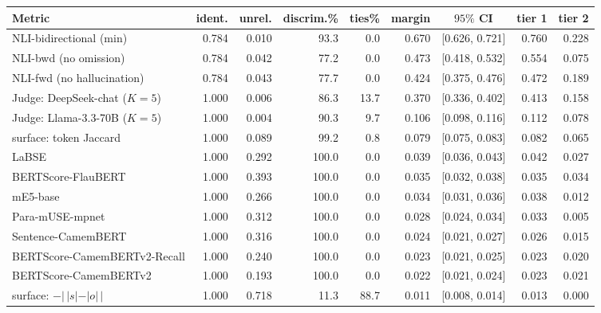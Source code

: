 \setlength{\tabcolsep}{3.5pt}
\begin{tabular}{lrrrrrcrr}
\toprule
Metric & ident. & unrel. & discrim.\% & ties\% & margin & $95\%$ CI & tier 1 & tier 2 \\
\midrule
NLI-bidirectional (min) & 0.784 & 0.010 & 93.3 & 0.0 & 0.670 & [0.626, 0.721] & 0.760 & 0.228 \\
NLI-bwd (no omission) & 0.784 & 0.042 & 77.2 & 0.0 & 0.473 & [0.418, 0.532] & 0.554 & 0.075 \\
NLI-fwd (no hallucination) & 0.784 & 0.043 & 77.7 & 0.0 & 0.424 & [0.375, 0.476] & 0.472 & 0.189 \\
Judge: DeepSeek-chat ($K{=}5$) & 1.000 & 0.006 & 86.3 & 13.7 & 0.370 & [0.336, 0.402] & 0.413 & 0.158 \\
Judge: Llama-3.3-70B ($K{=}5$) & 1.000 & 0.004 & 90.3 & 9.7 & 0.106 & [0.098, 0.116] & 0.112 & 0.078 \\
surface: token Jaccard & 1.000 & 0.089 & 99.2 & 0.8 & 0.079 & [0.075, 0.083] & 0.082 & 0.065 \\
LaBSE & 1.000 & 0.292 & 100.0 & 0.0 & 0.039 & [0.036, 0.043] & 0.042 & 0.027 \\
BERTScore-FlauBERT & 1.000 & 0.393 & 100.0 & 0.0 & 0.035 & [0.032, 0.038] & 0.035 & 0.034 \\
mE5-base & 1.000 & 0.266 & 100.0 & 0.0 & 0.034 & [0.031, 0.036] & 0.038 & 0.012 \\
Para-mUSE-mpnet & 1.000 & 0.312 & 100.0 & 0.0 & 0.028 & [0.024, 0.034] & 0.033 & 0.005 \\
Sentence-CamemBERT & 1.000 & 0.316 & 100.0 & 0.0 & 0.024 & [0.021, 0.027] & 0.026 & 0.015 \\
BERTScore-CamemBERTv2-Recall & 1.000 & 0.240 & 100.0 & 0.0 & 0.023 & [0.021, 0.025] & 0.023 & 0.020 \\
BERTScore-CamemBERTv2 & 1.000 & 0.193 & 100.0 & 0.0 & 0.022 & [0.021, 0.024] & 0.023 & 0.021 \\
surface: $-|\,|s|-|o|\,|$ & 1.000 & 0.718 & 11.3 & 88.7 & 0.011 & [0.008, 0.014] & 0.013 & 0.000 \\
\bottomrule
\end{tabular}
